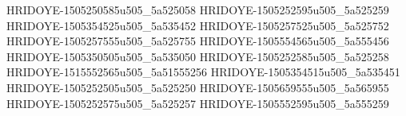 HRIDOYE-1505250585u505_5a525058
HRIDOYE-1505252595u505_5a525259
HRIDOYE-1505354525u505_5a535452
HRIDOYE-1505257525u505_5a525752
HRIDOYE-1505257555u505_5a525755
HRIDOYE-1505554565u505_5a555456
HRIDOYE-1505350505u505_5a535050
HRIDOYE-1505252585u505_5a525258
HRIDOYE-1515552565u505_5a51555256
HRIDOYE-1505354515u505_5a535451
HRIDOYE-1505252505u505_5a525250
HRIDOYE-1505659555u505_5a565955
HRIDOYE-1505252575u505_5a525257
HRIDOYE-1505552595u505_5a555259
